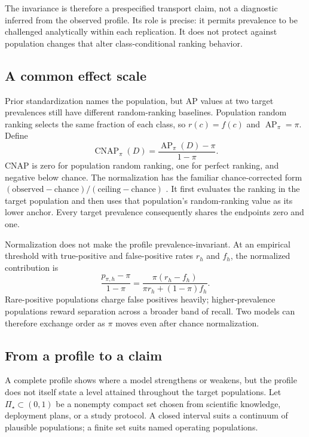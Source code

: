 \documentclass[11pt]{article}
\newcommand{\AP}{\operatorname{AP}}
\newcommand{\CNAP}{\operatorname{CNAP}}
\newcommand{\PSet}{\Pi_\star}
\theoremstyle{remark}
\begin{document}
The invariance is therefore a prespecified transport claim, not a diagnostic inferred from the observed profile. Its role is precise: it permits prevalence to be challenged analytically within each replication. It does not protect against population changes that alter class-conditional ranking behavior.

\subsection{A common effect scale}

Prior standardization names the population, but AP values at two target prevalences still have different random-ranking baselines. Population random ranking selects the same fraction of each class, so $r(c)=f(c)$ and $\AP_\pi=\pi$. Define
\begin{equation}
\CNAP_\pi(D)
=
\frac{\AP_\pi(D)-\pi}{1-\pi}.
\label{eq:cnap}
\end{equation}
CNAP is zero for population random ranking, one for perfect ranking, and negative below chance. The normalization has the familiar chance-corrected form $(\text{observed}-\text{chance})/(\text{ceiling}-\text{chance})$ \cite{cohen1960coefficient}. It first evaluates the ranking in the target population and then uses that population's random-ranking value as its lower anchor. Every target prevalence consequently shares the endpoints zero and one.

Normalization does not make the profile prevalence-invariant. At an empirical threshold with true-positive and false-positive rates $r_h$ and $f_h$, the normalized contribution is
\begin{equation}
\frac{p_{\pi,h}-\pi}{1-\pi}
=
\frac{\pi(r_h-f_h)}
{\pi r_h+(1-\pi)f_h}.
\label{eq:threshold-cnap}
\end{equation}
Rare-positive populations charge false positives heavily; higher-prevalence populations reward separation across a broader band of recall. Two models can therefore exchange order as $\pi$ moves even after chance normalization.

\subsection{From a profile to a claim}

A complete profile shows where a model strengthens or weakens, but the profile does not itself state a level attained throughout the target populations. Let $\PSet\subset(0,1)$ be a nonempty compact set chosen from scientific knowledge, deployment plans, or a study protocol. A closed interval suits a continuum of plausible populations; a finite set suits named operating populations.
\end{document}
